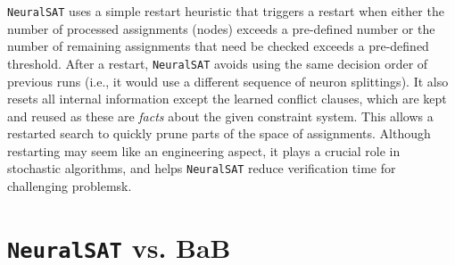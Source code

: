 \documentclass[oneside,11pt,dvipsnames]{book}
\numberwithin{equation}{section}
\theoremstyle{definition}
\theoremstyle{remark}
\newcommand{\tvn}[1]{\iftoggle{usecomment}{{\color{red}{[TVN]: #1}}}{}}
\newcommand{\hd}[1]{\iftoggle{usecomment}{{\color{blue}{[HD]: #1}}}{}}
\newcommand{\neuralsat}{\texttt{NeuralSAT}}
\newcommand{\tool}{\texttt{NeuralSAT}}
\begin{document}
\tool{} uses a simple restart heuristic that triggers a restart when either the number of processed assignments (nodes) exceeds a pre-defined number or the number of remaining assignments that need be checked exceeds a pre-defined threshold. %
After a restart, \tool{} avoids using the same decision order of previous runs (i.e., it would use a different sequence of neuron splittings). It also resets all internal information except the learned conflict clauses, which are kept and reused as these are \textit{facts} about the given constraint system.
This allows a restarted search to quickly prune parts of the space of assignments.
Although restarting may seem like an engineering aspect, it plays a crucial role in stochastic algorithms, and helps \neuralsat{} reduce verification time for challenging problemsk.






\section{\tool{} vs. BaB}\label{sec:restart-tree}
\end{document}
